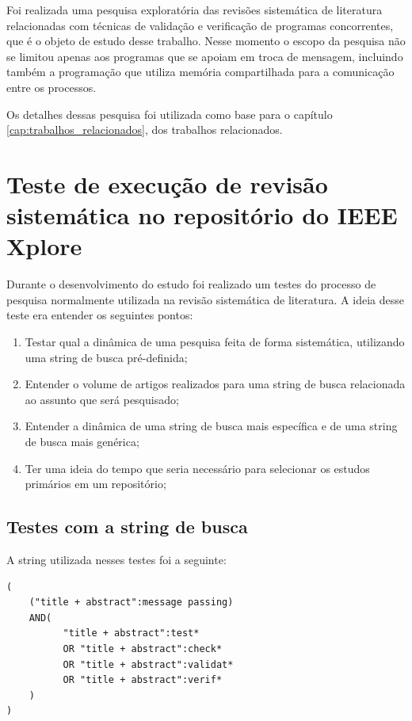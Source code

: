 Foi realizada uma pesquisa exploratória das revisões sistemática de literatura relacionadas com técnicas de  validação e verificação de programas concorrentes, que é o objeto de estudo desse trabalho. Nesse momento o escopo da pesquisa não se limitou apenas aos programas que se apoiam em troca de mensagem, incluindo também a programação que utiliza memória compartilhada para a comunicação entre os processos.

Os detalhes dessas pesquisa foi utilizada como base para o capítulo \ref{cap:trabalhos_relacionados}, dos trabalhos relacionados.

\section{Teste de execução de revisão sistemática no repositório do IEEE Xplore}

Durante o desenvolvimento do estudo foi realizado um testes do processo de pesquisa normalmente utilizada na revisão sistemática de literatura. A ideia desse teste era entender os seguintes pontos:

\begin{enumerate}
    \item Testar qual a dinâmica de uma pesquisa feita de forma sistemática, utilizando uma string de busca pré-definida;
    \item Entender o volume de artigos realizados para uma string de busca relacionada ao assunto que será pesquisado; 
    \item Entender a dinâmica de uma string de busca mais específica e de uma string de busca mais genérica;
    \item Ter uma ideia do tempo que seria necessário para selecionar os estudos primários em um repositório;
\end{enumerate}

\subsection{Testes com a string de busca}

A string utilizada nesses testes foi a seguinte:

\begin{verbatim}
(
    ("title + abstract":message passing)  
    AND(
          "title + abstract":test*
          OR "title + abstract":check*
          OR "title + abstract":validat* 
          OR "title + abstract":verif* 
    ) 
)
\end{verbatim}

